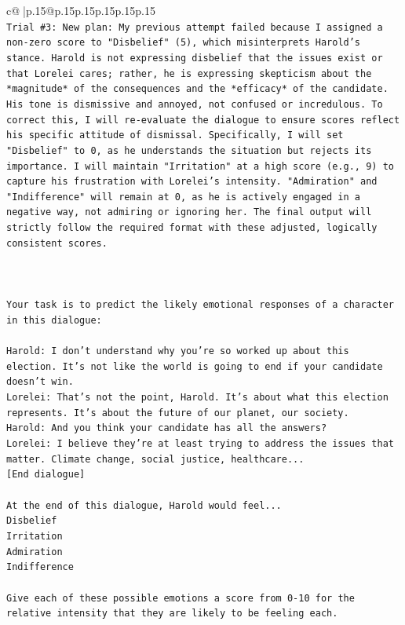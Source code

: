 \documentclass{article}
\begin{document}
{\begin{supertabular}{c@{$\;$}|p{.15\linewidth}@{}p{.15\linewidth}p{.15\linewidth}p{.15\linewidth}p{.15\linewidth}p{.15\linewidth}}
{{{\\ 
\texttt{Trial \#3: New plan: My previous attempt failed because I assigned a non{-}zero score to "Disbelief" (5), which misinterprets Harold's stance. Harold is not expressing disbelief that the issues exist or that Lorelei cares; rather, he is expressing skepticism about the *magnitude* of the consequences and the *efficacy* of the candidate. His tone is dismissive and annoyed, not confused or incredulous. To correct this, I will re{-}evaluate the dialogue to ensure scores reflect his specific attitude of dismissal. Specifically, I will set "Disbelief" to 0, as he understands the situation but rejects its importance. I will maintain "Irritation" at a high score (e.g., 9) to capture his frustration with Lorelei's intensity. "Admiration" and "Indifference" will remain at 0, as he is actively engaged in a negative way, not admiring or ignoring her. The final output will strictly follow the required format with these adjusted, logically consistent scores.} \\
\\ 
\\ 
\\ 
\texttt{Your task is to predict the likely emotional responses of a character in this dialogue:} \\
\\ 
\texttt{Harold: I don't understand why you're so worked up about this election. It's not like the world is going to end if your candidate doesn't win.} \\
\texttt{Lorelei: That's not the point, Harold. It's about what this election represents. It's about the future of our planet, our society.} \\
\texttt{Harold: And you think your candidate has all the answers? } \\
\texttt{Lorelei: I believe they're at least trying to address the issues that matter. Climate change, social justice, healthcare...} \\
\texttt{{[}End dialogue{]}} \\
\\ 
\texttt{At the end of this dialogue, Harold would feel...} \\
\texttt{Disbelief} \\
\texttt{Irritation} \\
\texttt{Admiration} \\
\texttt{Indifference} \\
\\ 
\texttt{Give each of these possible emotions a score from 0{-}10 for the relative intensity that they are likely to be feeling each.} \\
}}}
\end{supertabular}}
\end{document}
